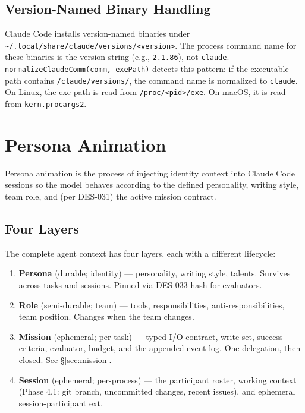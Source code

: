 \documentclass[a4paper,10pt]{article}
\newcommand{\fpath}[1]{\texttt{#1}}
\begin{document}
\subsection{Version-Named Binary Handling}

Claude Code installs version-named binaries under
\fpath{\~{}/.local/share/claude/versions/<version>}.  The process
command name for these binaries is the version string (e.g.,
\texttt{2.1.86}), not \texttt{claude}.
\texttt{normalizeClaudeComm(comm, exePath)} detects this pattern:
if the executable path contains \texttt{/claude/versions/}, the
command name is normalized to \texttt{claude}.  On Linux, the exe
path is read from \texttt{/proc/<pid>/exe}.  On macOS, it is read
from \texttt{kern.procargs2}.

\section{Persona Animation}

Persona animation is the process of injecting identity context into
Claude Code sessions so the model behaves according to the defined
personality, writing style, team role, and (per DES-031) the active
mission contract.

\subsection{Four Layers}

The complete agent context has four layers, each with a different
lifecycle:

\begin{enumerate}
  \item \textbf{Persona} (durable; identity) --- personality, writing
    style, talents.  Survives across tasks and sessions.  Pinned
    via DES-033 hash for evaluators.
  \item \textbf{Role} (semi-durable; team) --- tools,
    responsibilities, anti-responsibilities, team position.
    Changes when the team changes.
  \item \textbf{Mission} (ephemeral; per-task) --- typed I/O contract,
    write-set, success criteria, evaluator, budget, and the
    appended event log.  One delegation, then closed.  See
    \S\ref{sec:mission}.
  \item \textbf{Session} (ephemeral; per-process) --- the participant
    roster, working context (Phase 4.1: git branch, uncommitted
    changes, recent issues), and ephemeral session-participant ext.
\end{enumerate}
\end{document}
